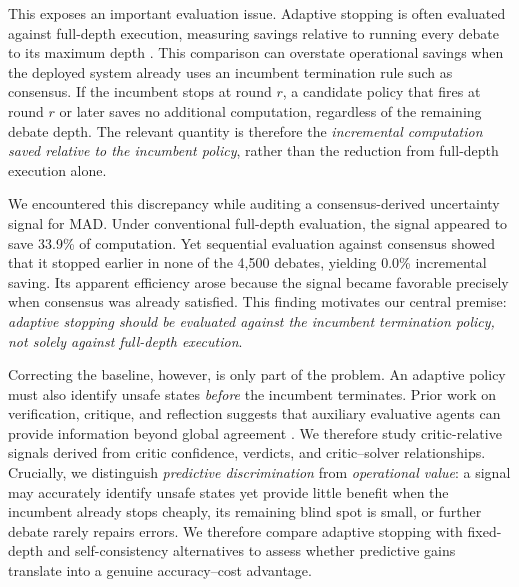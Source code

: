\documentclass{llncs}
\begin{document}
This exposes an important evaluation issue. Adaptive stopping is often evaluated against full-depth execution, measuring savings relative to running every debate to its maximum depth \cite{ref_9}. This comparison can overstate operational savings when the deployed system already uses an incumbent termination rule such as consensus. If the incumbent stops at round $r$, a candidate policy that fires at round $r$ or later saves no additional computation, regardless of the remaining debate depth. The relevant quantity is therefore the \emph{incremental computation saved relative to the incumbent policy}, rather than the reduction from full-depth execution alone.

We encountered this discrepancy while auditing a consensus-derived uncertainty signal for MAD. Under conventional full-depth evaluation, the signal appeared to save 33.9\% of computation. Yet sequential evaluation against consensus showed that it stopped earlier in none of the 4,500 debates, yielding 0.0\% incremental saving. Its apparent efficiency arose because the signal became favorable precisely when consensus was already satisfied. This finding motivates our central premise: \emph{adaptive stopping should be evaluated against the incumbent termination policy, not solely against full-depth execution}.

Correcting the baseline, however, is only part of the problem. An adaptive policy must also identify unsafe states \emph{before} the incumbent terminates. Prior work on verification, critique, and reflection suggests that auxiliary evaluative agents can provide information beyond global agreement \cite{ref_11,ref_12,ref_13}. We therefore study critic-relative signals derived from critic confidence, verdicts, and critic--solver relationships. Crucially, we distinguish \emph{predictive discrimination} from \emph{operational value}: a signal may accurately identify unsafe states yet provide little benefit when the incumbent already stops cheaply, its remaining blind spot is small, or further debate rarely repairs errors. We therefore compare adaptive stopping with fixed-depth and self-consistency alternatives \cite{ref_10} to assess whether predictive gains translate into a genuine accuracy--cost advantage.
\end{document}

